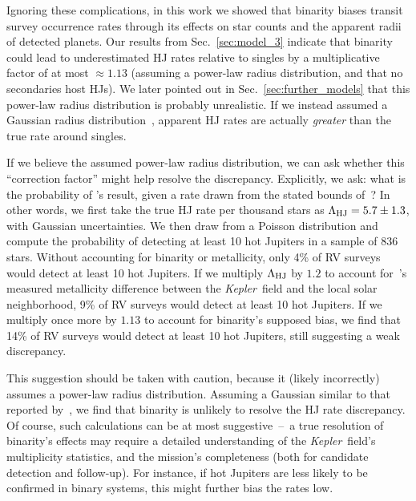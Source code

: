\documentclass[12pt,modern]{aastex61}
\begin{document}
Ignoring these complications, in this work we showed that
binarity biases transit survey occurrence rates through its effects on 
star counts and the apparent radii of detected planets.
Our results from Sec.~\ref{sec:model_3} indicate that binarity 
could lead to underestimated HJ rates relative to singles by a multiplicative 
factor of at most $\approx 1.13$ (assuming a power-law radius distribution, 
and that no secondaries host HJs).
We later pointed out in Sec.~\ref{sec:further_models} that this power-law 
radius distribution is probably unrealistic. If we instead assumed a 
Gaussian radius distribution~\citep[e.g.,][]{petigura_CKS_2017}, apparent HJ 
rates are actually {\it greater} 
than the true rate around singles.

If we believe the assumed power-law radius distribution, we can ask whether 
this ``correction factor'' might help resolve the discrepancy.
Explicitly, we ask: what is the probability of \citet{wright_frequency_2012}'s 
result, given a rate drawn from the stated bounds of~\citet{petigura_CKS_2017}?
In other words, we first take the true HJ rate per thousand stars as 
$\Lambda_{\rm HJ} = 5.7 \pm 1.3$, with Gaussian uncertainties. 
We then draw from a Poisson distribution and compute the probability of 
detecting at least 10 hot Jupiters in a sample of 836 stars.
Without accounting for binarity or metallicity, only 4\% of RV surveys would 
detect at least 10 hot Jupiters.
If we multiply $\Lambda_{\rm HJ}$ by $1.2$ to account 
for~\citet{guo_metallicity_2017}'s measured metallicity difference between the 
{\it Kepler}\ field and the local solar neighborhood, 9\% of RV surveys would 
detect at least 10 hot Jupiters.
If we multiply once more by $1.13$ to account for binarity's supposed bias, we 
find that 14\% of RV surveys would detect at least 10 hot Jupiters, still 
suggesting a weak discrepancy.

This suggestion should be taken with caution, because it (likely incorrectly) 
assumes a power-law radius distribution.
Assuming a Gaussian similar to that reported by~\citet{petigura_CKS_2017},
we find that binarity is unlikely to resolve the HJ rate discrepancy.
Of course, such calculations can be at most suggestive~--~a true resolution 
of binarity's effects may require a detailed understanding of the 
{\it Kepler}\ field's multiplicity statistics, and the mission's completeness 
(both for candidate detection and follow-up).
For instance, if hot Jupiters are less likely to be confirmed in binary 
systems, this might further bias the rates low.
\end{document}
